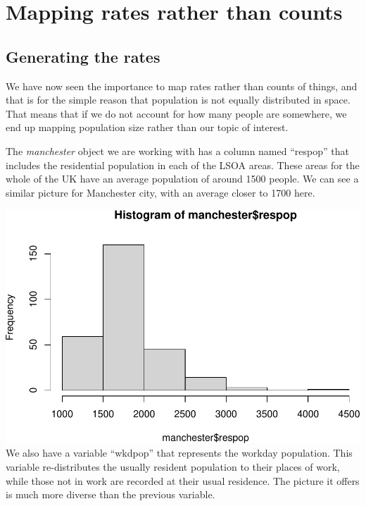 \documentclass[
]{book}
\makeatletter
\newenvironment{Shaded}{\begin{snugshade}}{\end{snugshade}}
\newcommand{\FunctionTok}[1]{\textcolor[rgb]{0,0,0}{#1}}
\newcommand{\NormalTok}[1]{#1}
\newcommand{\SpecialCharTok}[1]{\textcolor[rgb]{0,0,0}{#1}}
\newenvironment{kframe}{%
\medskip{}
\setlength{\fboxsep}{.8em}
 \def\at@end@of@kframe{}%
 \ifinner\ifhmode%
  \def\at@end@of@kframe{\end{minipage}}%
  \begin{minipage}{\columnwidth}%
 \fi\fi%
 \def\FrameCommand##1{\hskip\@totalleftmargin \hskip-\fboxsep
 \colorbox{shadecolor}{##1}\hskip-\fboxsep
     \hskip-\linewidth \hskip-\@totalleftmargin \hskip\columnwidth}%
 \MakeFramed {\advance\hsize-\width
   \@totalleftmargin\z@ \linewidth\hsize
   \@setminipage}}%
 {\par\unskip\endMakeFramed%
 \at@end@of@kframe}
\renewenvironment{Shaded}{\begin{kframe}}{\end{kframe}}
\makeatother
\begin{document}
\hypertarget{mapping-rates-rather-than-counts}{%
\section{Mapping rates rather than counts}\label{mapping-rates-rather-than-counts}}

\hypertarget{generating-the-rates}{%
\subsection{Generating the rates}\label{generating-the-rates}}

We have now seen the importance to map rates rather than counts of things, and that is for the simple reason that population is not equally distributed in space. That means that if we do not account for how many people are somewhere, we end up mapping population size rather than our topic of interest.

The \emph{manchester} object we are working with has a column named ``respop'' that includes the residential population in each of the LSOA areas. These areas for the whole of the UK have an average population of around 1500 people. We can see a similar picture for Manchester city, with an average closer to 1700 here.

\begin{Shaded}
\end{Shaded}

\includegraphics{crime_mapping_files/figure-latex/unnamed-chunk-81-1.pdf}
We also have a variable ``wkdpop'' that represents the workday population. This variable re-distributes the usually resident population to their places of work, while those not in work are recorded at their usual residence. The picture it offers is much more diverse than the previous variable.
\end{document}
